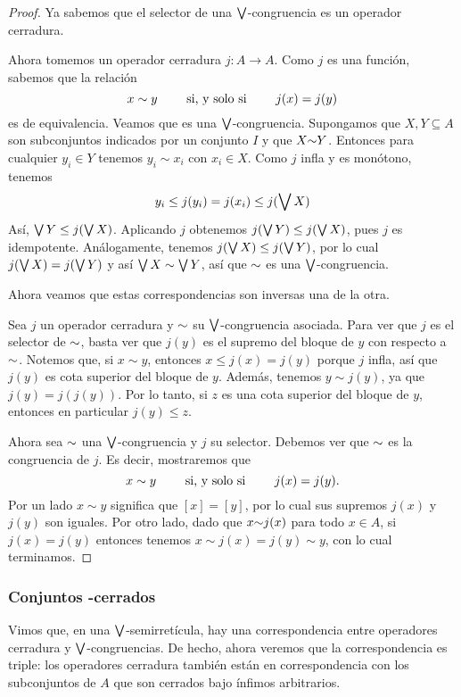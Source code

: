 \begin{proof}
  Ya sabemos que el selector de una $\bigvee$-congruencia es un
  operador cerradura.

  Ahora tomemos un operador cerradura $j:A\to A$.
  Como $j$ es una función, sabemos que la relación
  \[
    x\sim y\qquad\text{ si, y solo si }\qquad j(x)=j(y)
  \]
  es de equivalencia.
  Veamos que es una $\bigvee$-congruencia.
  Supongamos que $X,Y\subseteq A$ son subconjuntos indicados por
  un conjunto $I$ y que $X{\sim} Y$.
  Entonces para cualquier $y_i\in Y$ tenemos $y_i\sim x_i$ con
  $x_i\in X$. Como $j$ infla y es monótono, tenemos
  \[
    y_i\leq j(y_i)=j(x_i)\leq j(\bigvee X)
  \]
  Así, $\bigvee Y\leq j(\bigvee X)$.
  Aplicando $j$ obtenemos $j(\bigvee Y)\leq j(\bigvee X)$, pues $j$ es
  idempotente.
  Análogamente, tenemos $j(\bigvee X)\leq j(\bigvee Y)$, por lo cual
  $j(\bigvee X)=j(\bigvee Y)$ y así $\bigvee X\sim\bigvee Y$, así que
  ${\sim}$ es una $\bigvee$-congruencia.

  Ahora veamos que estas correspondencias son inversas una de la
  otra.
  
  Sea $j$ un operador cerradura y ${\sim}$ su $\bigvee$-congruencia
  asociada.
  Para ver que $j$ es el selector de ${\sim}$, basta ver que
  $j(y)$ es el supremo del bloque de $y$ con respecto a ${\sim}$.
  Notemos que, si $x\sim y$, entonces $x\leq j(x)=j(y)$ porque
  $j$ infla, así que $j(y)$ es cota superior del bloque de $y$.
  Además, tenemos $y\sim j(y)$, ya que $j(y)=j(j(y))$. Por lo
  tanto, si $z$ es una cota superior del bloque de $y$, entonces
  en particular $j(y)\leq z$.

  Ahora sea ${\sim}$ una $\bigvee$-congruencia y $j$ su selector.
  Debemos ver que ${\sim}$ es la congruencia de $j$. Es decir,
  mostraremos que
  \[
    x\sim y \qquad\text{ si, y solo si }\qquad j(x)=j(y)
  .\]
  Por un lado $x\sim y$ significa que $[x]=[y]$, por lo cual sus
  supremos $j(x)$ y $j(y)$ son iguales.
  Por otro lado, dado que $x{\sim} j(x)$ para todo $x\in A$, si
  $j(x)=j(y)$ entonces tenemos $x\sim j(x)=j(y)\sim y$, con lo
  cual terminamos.
\end{proof}

\subsubsection{Conjuntos -cerrados}

Vimos que, en una $\bigvee$-semirretícula, hay una correspondencia
entre operadores cerradura y $\bigvee$-congruencias.
De hecho, ahora veremos que la correspondencia es triple:
los operadores cerradura también están en correspondencia con los
subconjuntos de $A$ que son cerrados bajo ínfimos arbitrarios.

